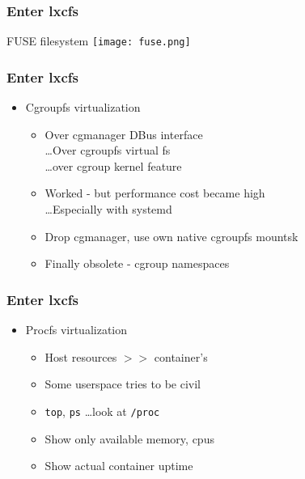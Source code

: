 \documentclass{beamer}
\begin{document}
\begin{frame}[fragile]
\frametitle{Enter lxcfs}
	FUSE filesystem
	\texttt{[image: fuse.png]}
\end{frame}

\begin{frame}[fragile]
\frametitle{Enter lxcfs}
	\begin{itemize}
	\item Cgroupfs virtualization
		\begin{itemize}
		\item Over cgmanager DBus interface \\
			\ldots Over cgroupfs virtual fs \\
			\ldots over cgroup kernel feature
		\item Worked - but performance cost became high \\
			\ldots Especially with systemd
		\pause
		\item Drop cgmanager, use own native cgroupfs mountsk
		\pause
		\item Finally obsolete - cgroup namespaces
		\end{itemize}
	\end{itemize}
\end{frame}

\begin{frame}[fragile]
\frametitle{Enter lxcfs}
	\begin{itemize}
	\item Procfs virtualization
		\begin{itemize}
		\item Host resources $>>$ container's
		\item Some userspace tries to be civil
		\item {\tt top}, {\tt ps} \dots look at {\tt /proc}
		\item Show only available memory, cpus
		\item Show actual container uptime
		\end{itemize}
	\end{itemize}
\end{frame}
\end{document}
